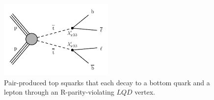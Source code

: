 \begin{figure}
\centering
\includegraphics[width=0.5\textwidth]{figures/intro/stopToLB.pdf}
\caption{Pair-produced top squarks that each decay to a bottom quark and a lepton through an R-parity-violating $LQD$ vertex.}
\label{stop_to_lb}
\end{figure}